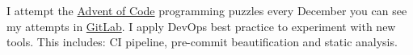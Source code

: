 \descript{ }
\vspace*{-\topsep}  %
\begin{justify}
I attempt the \href{https://adventofcode.com/}{Advent of Code} programming puzzles every December \textemdash{} you can see my attempts in \href{https://gitlab.com/laywill/}{GitLab}.
I apply DevOps best practice to experiment with new tools. This includes: CI pipeline, pre-commit beautification and static analysis.
\end{justify}
